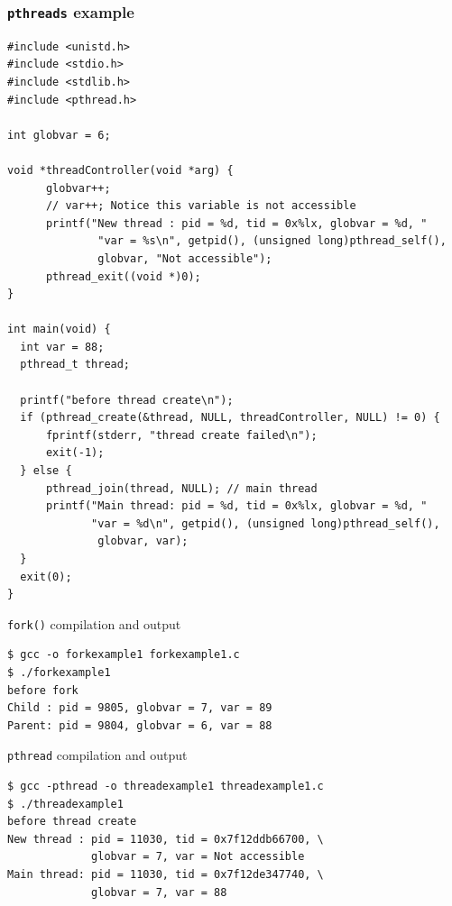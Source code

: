 \documentclass[hyperref={pdfpagelabels=false},svgnames]{beamer}
\begin{document}
\begin{frame}[fragile, shrink=10]
  \frametitle{\texttt{pthreads} example}
  \begin{verbatim}
#include <unistd.h>
#include <stdio.h>
#include <stdlib.h>
#include <pthread.h>

int globvar = 6;

void *threadController(void *arg) {
      globvar++; 
      // var++; Notice this variable is not accessible
      printf("New thread : pid = %d, tid = 0x%lx, globvar = %d, "
              "var = %s\n", getpid(), (unsigned long)pthread_self(),
              globvar, "Not accessible");
      pthread_exit((void *)0);        
}

int main(void) {
  int var = 88;
  pthread_t thread;

  printf("before thread create\n");
  if (pthread_create(&thread, NULL, threadController, NULL) != 0) {
      fprintf(stderr, "thread create failed\n");
      exit(-1);
  } else {
      pthread_join(thread, NULL); // main thread
      printf("Main thread: pid = %d, tid = 0x%lx, globvar = %d, " 
             "var = %d\n", getpid(), (unsigned long)pthread_self(),
              globvar, var);
  }
  exit(0);
}
  \end{verbatim}
\end{frame}

\begin{frame}[fragile]
  \begin{block}{\texttt{fork()} compilation and output}
    \begin{verbatim}
$ gcc -o forkexample1 forkexample1.c
$ ./forkexample1
before fork
Child : pid = 9805, globvar = 7, var = 89
Parent: pid = 9804, globvar = 6, var = 88
    \end{verbatim}
  \end{block}
  \begin{block}{\texttt{pthread} compilation and output}
    \begin{verbatim}
$ gcc -pthread -o threadexample1 threadexample1.c
$ ./threadexample1
before thread create
New thread : pid = 11030, tid = 0x7f12ddb66700, \ 
             globvar = 7, var = Not accessible
Main thread: pid = 11030, tid = 0x7f12de347740, \
             globvar = 7, var = 88
    \end{verbatim}
  \end{block}
\end{frame}
\end{document}
